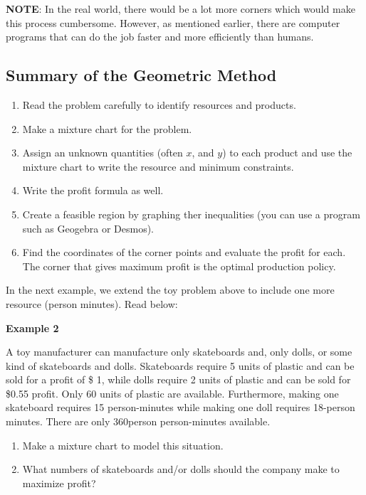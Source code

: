 \documentclass[
  letterpaper,
  DIV=11,
  numbers=noendperiod]{scrreprt}
\providecommand{\tightlist}{%
  \setlength{\itemsep}{0pt}\setlength{\parskip}{0pt}}\usepackage{longtable,booktabs,array}
\begin{document}
\textbf{NOTE}: In the real world, there would be a lot more corners
which would make this process cumbersome. However, as mentioned earlier,
there are computer programs that can do the job faster and more
efficiently than humans.

\hypertarget{summary-of-the-geometric-method}{%
\subsection{Summary of the Geometric
Method}\label{summary-of-the-geometric-method}}

\begin{enumerate}
\def\labelenumi{\arabic{enumi}.}
\tightlist
\item
  Read the problem carefully to identify resources and products.
\item
  Make a mixture chart for the problem.
\item
  Assign an unknown quantities (often \(x\), and \(y\)) to each product
  and use the mixture chart to write the resource and minimum
  constraints.
\item
  Write the profit formula as well.
\item
  Create a feasible region by graphing ther inequalities (you can use a
  program such as Geogebra or Desmos).
\item
  Find the coordinates of the corner points and evaluate the profit for
  each. The corner that gives maximum profit is the optimal production
  policy.
\end{enumerate}

In the next example, we extend the toy problem above to include one more
resource (person minutes). Read below:

\textbf{Example 2}

A toy manufacturer can manufacture only skateboards and, only dolls, or
some kind of skateboards and dolls. Skateboards require 5 units of
plastic and can be sold for a profit of \$ 1, while dolls require 2
units of plastic and can be sold for \$0.55 profit. Only 60 units of
plastic are available. Furthermore, making one skateboard requires 15
person-minutes while making one doll requires 18-person minutes. There
are only 360person person-minutes available.

\begin{enumerate}
\def\labelenumi{(\alph{enumi})}
\tightlist
\item
  Make a mixture chart to model this situation.
\item
  What numbers of skateboards and/or dolls should the company make to
  maximize profit?
\end{enumerate}
\end{document}
